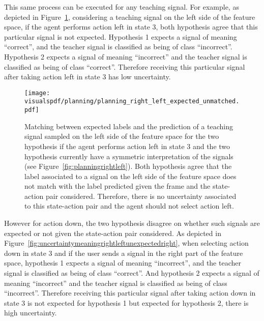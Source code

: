 This same process can be executed for any teaching signal. For example, as depicted in Figure~\ref{fig:uncertaintymeaningrightleftexpectedright}, considering a teaching signal on the left side of the feature space, if the agent performs action left in state 3, both hypothesis agree that this particular signal is not expected. Hypothesis 1 expects a signal of meaning ``correct'', and the teacher signal is classified as being of class ``incorrect''. Hypothesis 2 expects a signal of meaning ``incorrect'' and the teacher signal is classified as being of class ``correct''. Therefore receiving this particular signal after taking action left in state 3 has low uncertainty.

\begin{figure}[!htbp]
  \centering
  \texttt{[image: \\visualspdf/planning/planning\_right\_left\_expected\_unmatched.pdf]}
  \caption{Matching between expected labels and the prediction of a teaching signal sampled on the left side of the feature space for the two hypothesis if the agent performs action left in state 3 and the two hypothesis currently have a symmetric interpretation of the signals (see Figure~\ref{fig:planningrightleft}). Both hypothesis agree that the label associated to a signal on the left side of the feature space does not match with the label predicted given the frame and the state-action pair considered. Therefore, there is no uncertainty associated to this state-action pair and the agent should not select action left.}
  \label{fig:uncertaintymeaningrightleftexpectedright}
\end{figure}

However for action down, the two hypothesis disagree on whether such signals are expected or not given the state-action pair considered. As depicted in Figure~\ref{fig:uncertaintymeaningrightleftunexpectedright}, when selecting action down in state 3 and if the user sends a signal in the right part of the feature space, hypothesis 1 expects a signal of meaning ``incorrect'', and the teacher signal is classified as being of class ``correct''. And hypothesis 2 expects a signal of meaning ``incorrect'' and the teacher signal is classified as being of class ``incorrect''. Therefore receiving this particular signal after taking action down in state 3 is not expected for hypothesis 1 but expected for hypothesis 2, there is high uncertainty.

